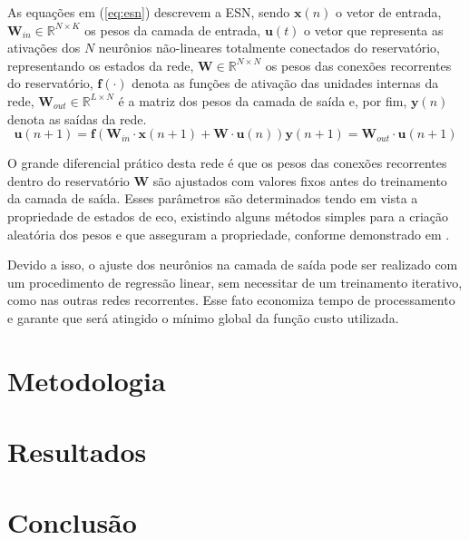 \documentclass[a4paper, 12pt]{article}
\begin{document}
As equações em (\ref{eq:esn}) descrevem a ESN, sendo $\mathbf{x}(n)$ o vetor de entrada, $\mathbf{W}_{in} \in \mathbb{R}^{N \times K}$ os pesos da camada de entrada, $\mathbf{u}(t)$ o vetor que representa as ativações dos $N$ neurônios não-lineares totalmente conectados do reservatório, representando os estados da rede, $\mathbf{W} \in \mathbb{R}^{N \times N}$ os pesos das conexões recorrentes do reservatório, $\mathbf{f}(\cdot)$ denota as funções de ativação das unidades internas da rede, $\mathbf{W}_{out} \in \mathbb{R}^{L \times N}$ é a matriz dos pesos da camada de saída e, por fim, $\mathbf{y}(n)$ denota as saídas da rede.
\begin{subequations}\label{eq:esn}
\begin{equation}
\mathbf{u}(n+1) = \mathbf{f}(\mathbf{W}_{in} \cdot \mathbf{x}(n+1) + \mathbf{W} \cdot \mathbf{u}(n))
\end{equation}
\begin{equation}
\mathbf{y}(n+1) = \mathbf{W}_{out} \cdot \mathbf{u}(n+1)
\end{equation}
\end{subequations}

O grande diferencial prático desta rede é que os pesos das conexões recorrentes dentro do reservatório $\mathbf{W}$ são ajustados com valores fixos antes do treinamento da camada de saída. Esses parâmetros são determinados tendo em vista a propriedade de estados de eco, existindo alguns métodos simples para a criação aleatória dos pesos e que asseguram a propriedade, conforme demonstrado em \cite{jaeger2007echo}. 

Devido a isso, o ajuste dos neurônios na camada de saída pode ser realizado com um procedimento de regressão linear, sem necessitar de um treinamento iterativo, como nas outras redes recorrentes. Esse fato economiza tempo de processamento e garante que será atingido o mínimo global da função custo utilizada.

\section{Metodologia}

\section{Resultados}

\section{Conclusão}



{\footnotesize }

\end{document}
